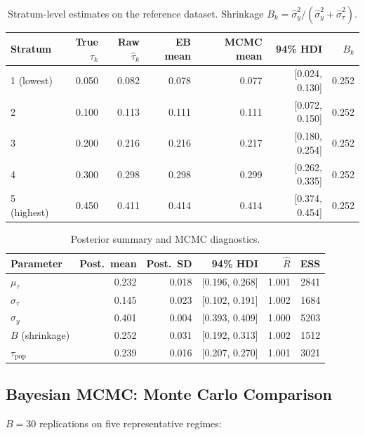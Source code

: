 \documentclass[11pt,letterpaper]{article}
\newcommand{\tauhat}{\hat{\tau}}
\newcommand{\sigmahat}{\hat{\sigma}}
\begin{document}
\begin{table}[htbp]
\centering
\caption{Stratum-level estimates on the reference dataset.
Shrinkage $B_k = \sigmahat_y^2 / (\sigmahat_y^2 + \sigmahat_\tau^2)$.}
\label{tab:mcmc-strata}
\small
\begin{tabular}{@{}l rrrrr r@{}}
\toprule
Stratum & True $\tau_k$ & Raw $\tauhat_k$ & EB mean & MCMC mean & 94\% HDI & $B_k$ \\
\midrule
1 (lowest)  & 0.050 & 0.082 & 0.078 & 0.077 & [0.024, 0.130] & 0.252 \\
2           & 0.100 & 0.113 & 0.111 & 0.111 & [0.072, 0.150] & 0.252 \\
3           & 0.200 & 0.216 & 0.216 & 0.217 & [0.180, 0.254] & 0.252 \\
4           & 0.300 & 0.298 & 0.298 & 0.299 & [0.262, 0.335] & 0.252 \\
5 (highest) & 0.450 & 0.411 & 0.414 & 0.414 & [0.374, 0.454] & 0.252 \\
\bottomrule
\end{tabular}
\end{table}

\begin{table}[htbp]
\centering
\caption{Posterior summary and MCMC diagnostics.}
\label{tab:mcmc-diag}
\small
\begin{tabular}{@{}l rrr rr@{}}
\toprule
Parameter & Post.\ mean & Post.\ SD & 94\% HDI & $\hat{R}$ & ESS \\
\midrule
$\mu_\tau$          & 0.232 & 0.018 & [0.196, 0.268] & 1.001 & 2841 \\
$\sigma_\tau$       & 0.145 & 0.023 & [0.102, 0.191] & 1.002 & 1684 \\
$\sigma_y$          & 0.401 & 0.004 & [0.393, 0.409] & 1.000 & 5203 \\
$B$ (shrinkage)     & 0.252 & 0.031 & [0.192, 0.313] & 1.002 & 1512 \\
$\tau_{\text{pop}}$ & 0.239 & 0.016 & [0.207, 0.270] & 1.001 & 3021 \\
\bottomrule
\end{tabular}
\end{table}


\subsection{Bayesian MCMC: Monte Carlo Comparison}\label{sec:mcmc-mc}

$B = 30$ replications on five representative regimes:
\end{document}

